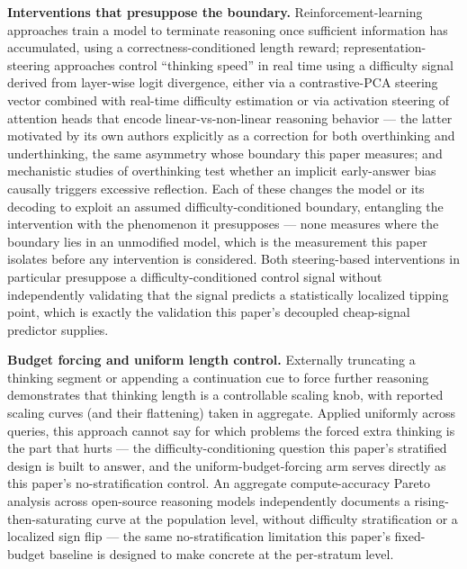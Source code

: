 \documentclass[11pt]{article}
\begin{document}
\textbf{Interventions that presuppose the boundary.} Reinforcement-learning approaches \cite{JET2u5Z} train a model to terminate reasoning once sufficient information has accumulated, using a correctness-conditioned length reward; representation-steering approaches control ``thinking speed'' in real time using a difficulty signal derived from layer-wise logit divergence, either via a contrastive-PCA steering vector combined with real-time difficulty estimation \cite{ThinkingSpeedESEL} or via activation steering of attention heads that encode linear-vs-non-linear reasoning behavior \cite{251224574} --- the latter motivated by its own authors explicitly as a correction for both overthinking and underthinking, the same asymmetry whose boundary this paper measures; and mechanistic studies of overthinking \cite{FirstImpression2PP7} test whether an implicit early-answer bias causally triggers excessive reflection. Each of these changes the model or its decoding to exploit an assumed difficulty-conditioned boundary, entangling the intervention with the phenomenon it presupposes --- none measures where the boundary lies in an unmodified model, which is the measurement this paper isolates before any intervention is considered. Both steering-based interventions \cite{ThinkingSpeedESEL,251224574} in particular presuppose a difficulty-conditioned control signal without independently validating that the signal predicts a statistically localized tipping point, which is exactly the validation this paper's decoupled cheap-signal predictor supplies.

\textbf{Budget forcing and uniform length control.} Externally truncating a thinking segment or appending a continuation cue to force further reasoning \cite{Muennighoff2025s1} demonstrates that thinking length is a controllable scaling knob, with reported scaling curves (and their flattening) taken in aggregate. Applied uniformly across queries, this approach cannot say for which problems the forced extra thinking is the part that hurts --- the difficulty-conditioning question this paper's stratified design is built to answer, and the uniform-budget-forcing arm serves directly as this paper's no-stratification control. An aggregate compute-accuracy Pareto analysis across open-source reasoning models \cite{251224776} independently documents a rising-then-saturating curve at the population level, without difficulty stratification or a localized sign flip --- the same no-stratification limitation this paper's fixed-budget baseline is designed to make concrete at the per-stratum level.
\end{document}
